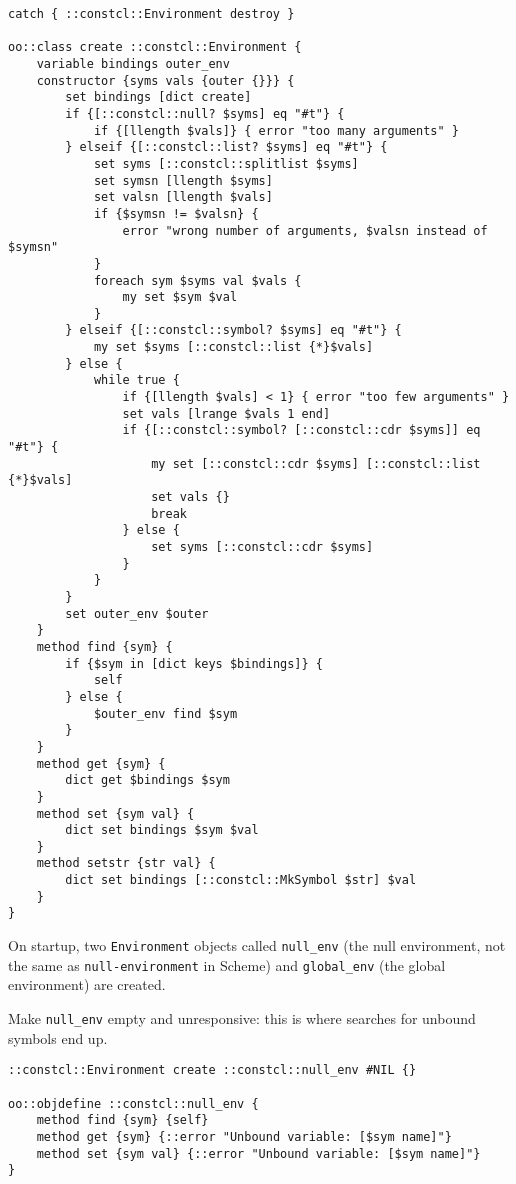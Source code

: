 \documentclass{report}
\begin{document}
\noindent\makebox[\linewidth]{\rule{\linewidth}{0.4pt}}
\begin{lstlisting}
catch { ::constcl::Environment destroy }
 
oo::class create ::constcl::Environment {
    variable bindings outer_env
    constructor {syms vals {outer {}}} {
        set bindings [dict create]
        if {[::constcl::null? $syms] eq "#t"} {
            if {[llength $vals]} { error "too many arguments" }
        } elseif {[::constcl::list? $syms] eq "#t"} {
            set syms [::constcl::splitlist $syms]
            set symsn [llength $syms]
            set valsn [llength $vals]
            if {$symsn != $valsn} {
                error "wrong number of arguments, $valsn instead of $symsn"
            }
            foreach sym $syms val $vals {
                my set $sym $val
            }
        } elseif {[::constcl::symbol? $syms] eq "#t"} {
            my set $syms [::constcl::list {*}$vals]
        } else {
            while true {
                if {[llength $vals] < 1} { error "too few arguments" }
                set vals [lrange $vals 1 end]
                if {[::constcl::symbol? [::constcl::cdr $syms]] eq "#t"} {
                    my set [::constcl::cdr $syms] [::constcl::list {*}$vals]
                    set vals {}
                    break
                } else {
                    set syms [::constcl::cdr $syms]
                }
            }
        }
        set outer_env $outer
    }
    method find {sym} {
        if {$sym in [dict keys $bindings]} {
            self
        } else {
            $outer_env find $sym
        }
    }
    method get {sym} {
        dict get $bindings $sym
    }
    method set {sym val} {
        dict set bindings $sym $val
    }
    method setstr {str val} {
        dict set bindings [::constcl::MkSymbol $str] $val
    }
}
\end{lstlisting}
\noindent\makebox[\linewidth]{\rule{\linewidth}{0.4pt}}

On startup, two \texttt{Environment} objects called \texttt{null\_env} (the null environment, not the same as \texttt{null-environment} in Scheme) and \texttt{global\_env} (the global environment) are created.


Make \texttt{null\_env} empty and unresponsive: this is where searches for unbound symbols end up.

\noindent\makebox[\linewidth]{\rule{\linewidth}{0.4pt}}
\begin{lstlisting}
::constcl::Environment create ::constcl::null_env #NIL {}
 
oo::objdefine ::constcl::null_env {
    method find {sym} {self}
    method get {sym} {::error "Unbound variable: [$sym name]"}
    method set {sym val} {::error "Unbound variable: [$sym name]"}
}
\end{lstlisting}
\noindent\makebox[\linewidth]{\rule{\linewidth}{0.4pt}}
\end{document}
